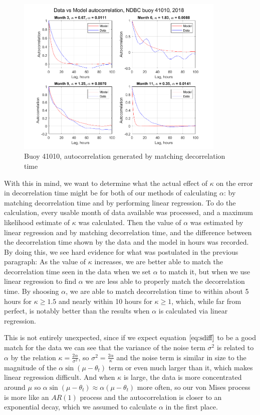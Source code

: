 \documentclass[12pt]{article}
\numberwithin{equation}{section}
\numberwithin{figure}{section}
\begin{document}
\begin{figure}[h]
\centering
\includegraphics[width=100mm]{New Folder/data v model ac 41010 2018 match decorr.png}
\caption{Buoy 41010, autocorrelation generated by matching decorrelation time}\label{fig:linreg ac}
\end{figure}

With this in mind, we want to determine what the actual effect of $\kappa$ on the error in decorrelation time might be for both of our methods of calculating $\alpha$: by matching decorrelation time and by performing linear regression. To do the calculation, every usable month of data available was processed, and a maximum likelihood estimate of $\kappa$ was calculated. Then the value of $\alpha$ was estimated by linear regression and by matching decorrelation time, and the difference between the decorrelation time shown by the data and the model in hours was recorded. By doing this, we see hard evidence for what was postulated in the previous paragraph: As the value of $\kappa$ increases, we are better able to match the decorrelation time seen in the data when we set $\alpha$ to match it, but when we use linear regression to find $\alpha$ we are less able to properly match the decorrelation time. By shoosing $\alpha$, we are able to match decorrelation time to within about 5 hours for $\kappa \ge 1.5$ and nearly within 10 hours for $\kappa \ge 1$, which, while far from perfect, is notably better than the results when $\alpha$ is calculated via linear regression.

This is not entirely unexpected, since if we expect equation $\ref{eq:sdiff}$ to be a good match for the data we can see that the variance of the noise term $\sigma^2$ is related to $\alpha$ by the relation $\kappa =\frac{2\alpha}{\sigma^2}$, so $\sigma^2 = \frac{2\alpha}{\kappa}$ and the noise term is similar in size to the magnitude of the $\alpha \sin(\mu-\theta_t)$ term or even much larger than it, which makes linear regression difficult. And when $\kappa$ is large, the data is more concentrated around $\mu$ so $\alpha \sin(\mu-\theta_t) \approx \alpha (\mu-\theta_t)$ more often, so our von Mises process is more like an $AR(1)$ process and the autocorrelation is closer to an exponential decay, which we assumed to calculate $\alpha$ in the first place.
\end{document}
